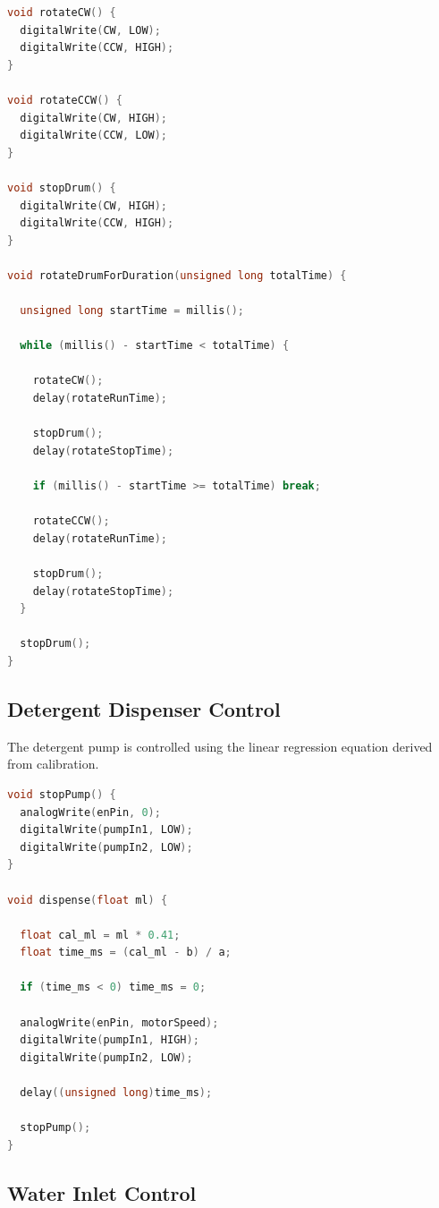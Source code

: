 \begin{lstlisting}[language=C++, caption=Motor Rotation Control, label=lst:motor]
void rotateCW() {
  digitalWrite(CW, LOW);
  digitalWrite(CCW, HIGH);
}

void rotateCCW() {
  digitalWrite(CW, HIGH);
  digitalWrite(CCW, LOW);
}

void stopDrum() {
  digitalWrite(CW, HIGH);
  digitalWrite(CCW, HIGH);
}

void rotateDrumForDuration(unsigned long totalTime) {

  unsigned long startTime = millis();

  while (millis() - startTime < totalTime) {

    rotateCW();
    delay(rotateRunTime);

    stopDrum();
    delay(rotateStopTime);

    if (millis() - startTime >= totalTime) break;

    rotateCCW();
    delay(rotateRunTime);

    stopDrum();
    delay(rotateStopTime);
  }

  stopDrum();
}
\end{lstlisting}

\subsection{Detergent Dispenser Control}
The detergent pump is controlled using the linear regression equation derived from calibration.

\begin{lstlisting}[language=C++, caption=Detergent Dispensing Functions, label=lst:detergent]
void stopPump() {
  analogWrite(enPin, 0);
  digitalWrite(pumpIn1, LOW);
  digitalWrite(pumpIn2, LOW);
}

void dispense(float ml) {

  float cal_ml = ml * 0.41;
  float time_ms = (cal_ml - b) / a;

  if (time_ms < 0) time_ms = 0;

  analogWrite(enPin, motorSpeed);
  digitalWrite(pumpIn1, HIGH);
  digitalWrite(pumpIn2, LOW);

  delay((unsigned long)time_ms);

  stopPump();
}
\end{lstlisting}

\subsection{Water Inlet Control}

